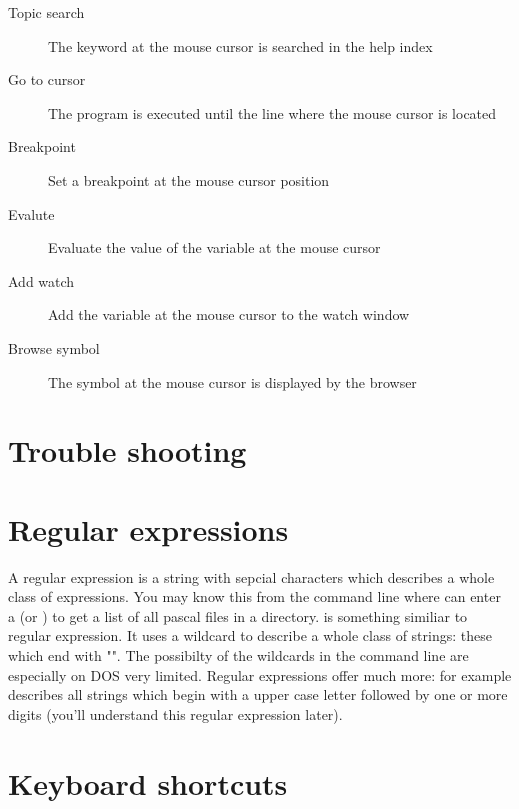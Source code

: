 \begin{description}
\item [Topic search] The keyword at the mouse cursor is searched in the
help index
\item [Go to cursor] The program is executed until the line where
the mouse cursor is located
\item [Breakpoint] Set a breakpoint at the mouse cursor position
\item [Evalute] Evaluate the value of the variable at the mouse
cursor
\item [Add watch] Add the variable at the mouse cursor to the
watch window
\item [Browse symbol] The symbol at the mouse cursor is displayed
by the browser
\end{description}


\section{Trouble shooting}

\section{Regular expressions}
\label{se:regexpr}
A regular expression is a string with sepcial characters which describes 
a whole class of expressions. You may know this from the command line
where can enter a  (or ) to get a list
of all pascal files in a directory.  is something 
similiar to regular expression. It uses a wildcard to describe a whole 
class of strings: these which end with "". The possibilty 
of the wildcards in the command line are especially on DOS very limited. 
Regular expressions offer much more: for example \file{[A-Z][0-9]+} 
describes all strings which begin with a upper case letter followed by
one or more digits (you'll understand this regular expression later).


\section{Keyboard shortcuts}
\label{se:keyshortcuts}

